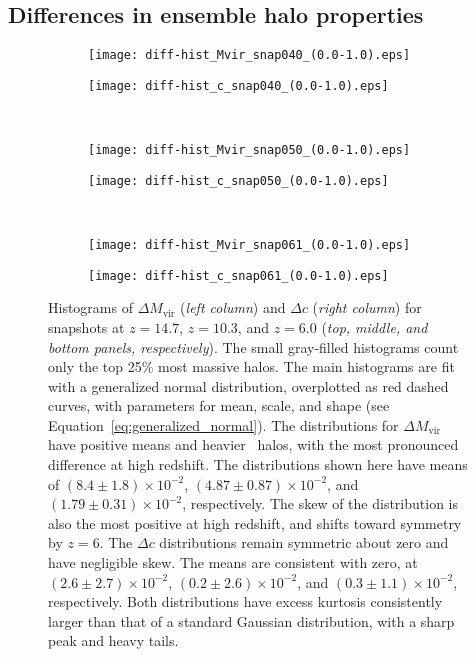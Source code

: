 \subsection{Differences in ensemble halo properties}


\begin{figure*}[t]
	\centering
	\begin{subfigure}{}
		\texttt{[image: diff-hist\_Mvir\_snap040\_(0.0-1.0).eps]}
	\end{subfigure}
	\begin{subfigure}{}
		\texttt{[image: diff-hist\_c\_snap040\_(0.0-1.0).eps]}
	\end{subfigure}
	\\
	\begin{subfigure}{}
		\texttt{[image: diff-hist\_Mvir\_snap050\_(0.0-1.0).eps]}
	\end{subfigure}
	\begin{subfigure}{}
		\texttt{[image: diff-hist\_c\_snap050\_(0.0-1.0).eps]}
	\end{subfigure}
	\\
	\begin{subfigure}{}
		\texttt{[image: diff-hist\_Mvir\_snap061\_(0.0-1.0).eps]}
	\end{subfigure}
	\begin{subfigure}{}
		\texttt{[image: diff-hist\_c\_snap061\_(0.0-1.0).eps]}
	\end{subfigure}
	\caption[Histograms of $\Delta M_{\mathrm{vir}}$ and $\Delta c$]{\footnotesize Histograms of $\Delta M_{\mathrm{vir}}$ (\textit{left column}) and $\Delta c$ (\textit{right column}) for snapshots at $z = 14.7$, $z = 10.3$, and $z = 6.0$ (\textit{top, middle, and bottom panels, respectively}).  The small gray-filled histograms count only the top 25\% most massive halos.  The main histograms are fit with a generalized normal distribution, overplotted as red dashed curves, with parameters for mean, scale, and shape (see Equation~\ref{eq:generalized_normal}).  The distributions for $\Delta M_{\mathrm{vir}}$ have positive means and heavier \lpt\ halos, with the most pronounced difference at high redshift.  The distributions shown here have means of $(8.4 \pm 1.8) \times 10^{-2}$, $(4.87 \pm 0.87) \times 10^{-2}$, and $(1.79 \pm 0.31) \times 10^{-2}$, respectively.  The skew of the distribution is also the most positive at high redshift, and shifts toward symmetry by $z = 6$.  The $\Delta c$ distributions remain symmetric about zero and have negligible skew.  The means are consistent with zero, at $(2.6 \pm 2.7) \times 10^{-2}$, $(0.2 \pm 2.6) \times 10^{-2}$, and $(0.3 \pm 1.1) \times 10^{-2}$, respectively.  Both distributions have excess kurtosis consistently larger than that of a standard Gaussian distribution, with a sharp peak and heavy tails.}
	\label{fig:diff-hist}
\end{figure*}

